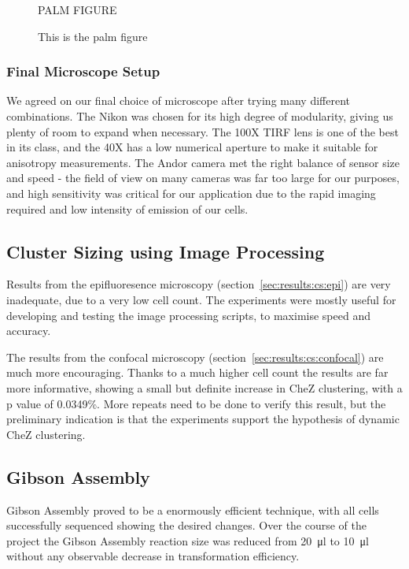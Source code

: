 \documentclass[../main.tex]{subfiles}
\begin{document}
\begin{figure}[h!]
PALM FIGURE
\caption{This is the palm figure}
\end{figure}

\subsubsection{Final Microscope Setup}

We agreed on our final choice of microscope after trying many different combinations. The Nikon was chosen for its high degree of modularity, giving us plenty of room to expand when necessary. The 100X TIRF lens is one of the best in its class, and the 40X has a low numerical aperture to make it suitable for anisotropy measurements\cite{lakowicz}. The Andor camera met the right balance of sensor size and speed - the field of view on many cameras was far too large for our purposes, and high sensitivity was critical for our application due to the rapid imaging required and low intensity of emission of our cells.

\subsection{Cluster Sizing using Image Processing}

Results from the epifluoresence microscopy (section~\ref{sec:results:cs:epi}) are very inadequate, due to a very low cell count. The experiments were mostly useful for developing and testing the image processing scripts, to maximise speed and accuracy.

The results from the confocal microscopy (section~\ref{sec:results:cs:confocal}) are much more encouraging. Thanks to a much higher cell count the results are far more informative, showing a small but definite increase in CheZ clustering, with a p value of 0.0349\%. More repeats need to be done to verify this result, but the preliminary indication is that the experiments support the hypothesis of dynamic CheZ clustering.

\subsection{Gibson Assembly}
Gibson Assembly proved to be a enormously efficient technique, with all cells successfully sequenced showing the desired changes. Over the course of the project the Gibson Assembly reaction size was reduced from \SI{20}{\micro\litre} to \SI{10}{\micro\litre} without any observable decrease in transformation efficiency. 
\end{document}
